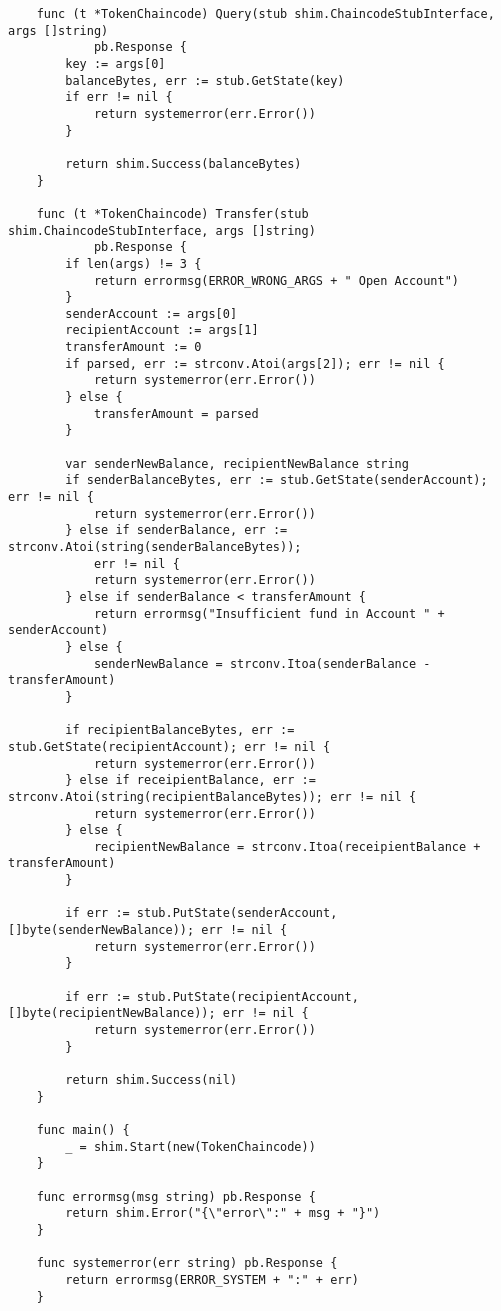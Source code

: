 \begin{lstlisting}
    func (t *TokenChaincode) Query(stub shim.ChaincodeStubInterface, args []string) 
            pb.Response {
        key := args[0]
        balanceBytes, err := stub.GetState(key)
        if err != nil {
            return systemerror(err.Error())
        }
    
        return shim.Success(balanceBytes)
    }
    
    func (t *TokenChaincode) Transfer(stub shim.ChaincodeStubInterface, args []string) 
            pb.Response {
        if len(args) != 3 { 
            return errormsg(ERROR_WRONG_ARGS + " Open Account")
        }
        senderAccount := args[0]
        recipientAccount := args[1]
        transferAmount := 0
        if parsed, err := strconv.Atoi(args[2]); err != nil {
            return systemerror(err.Error())
        } else {
            transferAmount = parsed
        }
    
        var senderNewBalance, recipientNewBalance string
        if senderBalanceBytes, err := stub.GetState(senderAccount); err != nil {
            return systemerror(err.Error())
        } else if senderBalance, err := strconv.Atoi(string(senderBalanceBytes)); 
            err != nil {
            return systemerror(err.Error())
        } else if senderBalance < transferAmount {
            return errormsg("Insufficient fund in Account " + senderAccount)
        } else {
            senderNewBalance = strconv.Itoa(senderBalance - transferAmount)
        }
    
        if recipientBalanceBytes, err := stub.GetState(recipientAccount); err != nil {
            return systemerror(err.Error())
        } else if receipientBalance, err := strconv.Atoi(string(recipientBalanceBytes)); err != nil {
            return systemerror(err.Error())
        } else {
            recipientNewBalance = strconv.Itoa(receipientBalance + transferAmount)
        }
    
        if err := stub.PutState(senderAccount, []byte(senderNewBalance)); err != nil {
            return systemerror(err.Error())
        }
    
        if err := stub.PutState(recipientAccount, []byte(recipientNewBalance)); err != nil {
            return systemerror(err.Error())
        }
    
        return shim.Success(nil)
    }
    
    func main() {
        _ = shim.Start(new(TokenChaincode))
    }
    
    func errormsg(msg string) pb.Response {
        return shim.Error("{\"error\":" + msg + "}")
    }
    
    func systemerror(err string) pb.Response {
        return errormsg(ERROR_SYSTEM + ":" + err)
    }
\end{lstlisting}

